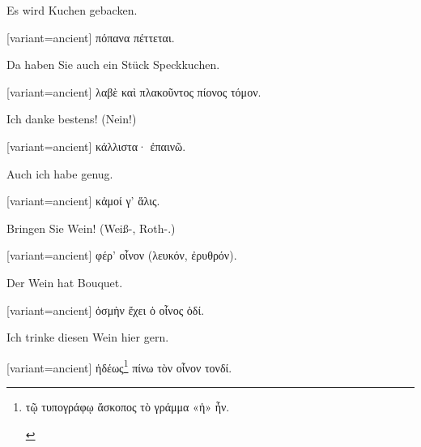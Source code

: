Es wird Kuchen gebacken.

\switchcolumn

\begin{greek}[variant=ancient]%
πόπανα πέττεται.

\end{greek}%
\switchcolumn*

Da haben Sie auch ein Stück Speckkuchen.

\switchcolumn

\begin{greek}[variant=ancient]%
λαβὲ καὶ πλακοῦντος πίονος τόμον.

\end{greek}%
\switchcolumn*

Ich danke bestens! (Nein!)

\switchcolumn

\begin{greek}[variant=ancient]%
κάλλιστα· ἐπαινῶ.

\end{greek}%
\switchcolumn*

Auch ich habe genug.

\switchcolumn

\begin{greek}[variant=ancient]%
κἀμοί γ' ἅλις.

\end{greek}%
\switchcolumn*

Bringen Sie Wein! (Weiß-, Roth-.)

\switchcolumn

\begin{greek}[variant=ancient]%
φέρ' οἶνον (λευκόν, ἐρυθρόν).

\end{greek}%
\switchcolumn*

Der Wein hat Bouquet.

\switchcolumn

\begin{greek}[variant=ancient]%
ὀσμὴν ἔχει ὁ οἶνος ὁδί.

\end{greek}%
\switchcolumn*

Ich trinke diesen Wein hier gern.

\switchcolumn

\begin{greek}[variant=ancient]%
ἡδέως\footnote{\begin{latin}%
\textgreek[variant=ancient]{τῷ τυπογράφῳ ἄσκοπος τὸ γράμμα «ἡ» ἦν.}\end{latin}%
} πίνω τὸν οἶνον τονδί.

\end{greek}%
\switchcolumn*

